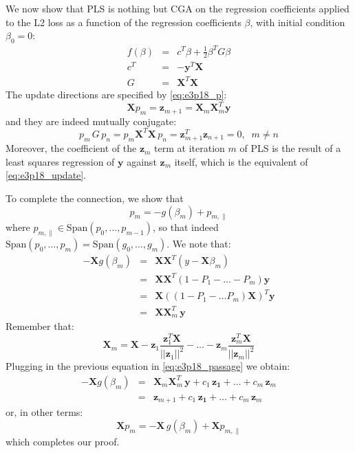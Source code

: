 We now show that PLS is nothing but CGA on the regression coefficients
applied to the L2 loss as a function of the regression coefficients
$\beta$, with initial condition $\beta_0 = 0$:
\begin{eqnarray*}
    f(\beta) & = & c^T \beta + \frac{1}{2} \beta^T G \beta \\
    c^T & = & - \mathbf{y}^T \mathbf{X} \\
    G & = & \mathbf{X}^T \mathbf{X}
\end{eqnarray*}
The update directions are specified by \eqref{eq:e3p18_p}:
\begin{equation*}
\mathbf{X} p_m  =  \mathbf{z}_{m + 1} = \mathbf{X}_m \mathbf{X}_m^T \mathbf{y}
\end{equation*}
and they are indeed mutually conjugate:
\begin{equation}
p_m \, G \, p_n = p_m \mathbf{X}^T \mathbf{X} \, p_n = 
    \mathbf{z}_{m + 1} ^T \mathbf{z}_{n + 1} = 0, \;\; m \neq n
\end{equation}
Moreover, the coefficient of the $\mathbf{z}_m$ term at iteration $m$ of PLS
is the result of a least squares regression of $\mathbf{y}$ against
$\mathbf{z}_m$ itself, which is the equivalent of \eqref{eq:e3p18_update}.

To complete the connection, we show that 
$$p_m = -g(\beta_m) + p_{m, \parallel}$$
where $p_{m, \parallel} \in \textrm{Span} \left(p_0, \ldots, p_{m - 1}\right)$,
so that indeed $\textrm{Span} \left(p_0, \ldots, p_m\right) = \textrm{Span} \left(g_0, \ldots, g_m\right)$. We note that:
\begin{eqnarray}
    - \mathbf{X} g(\beta_m) & = & \mathbf{X} \mathbf{X}^T \left(y - \mathbf{X} \beta_m\right) \\
    & = &  \mathbf{X} \mathbf{X}^T \left(1 - P_1 - \ldots - P_m\right) \mathbf{y} \\
    & = & \mathbf{X} \left((1 - P_1- \ldots P_m) \mathbf{X}\right)^T \mathbf{y} \\
    \label{eq:e3p18_passage}
    & = & \mathbf{X} \mathbf{X}_m^T\, \mathbf{y}
\end{eqnarray}
Remember that:
\begin{equation}
\mathbf{X}_m = \mathbf{X} 
    - \mathbf{z}_1 \frac{\mathbf{z}_1^T \mathbf{X}}{||\mathbf{z}_1||^2} - \ldots
    - \mathbf{z}_m \frac{\mathbf{z}_m^T \mathbf{X}}{||\mathbf{z}_m||^2}
\end{equation}
Plugging in the previous equation in \eqref{eq:e3p18_passage} we obtain:
\begin{eqnarray*}
    - \mathbf{X} g(\beta_m) & = & \mathbf{X}_m \mathbf{X}_m^T\, \mathbf{y} + 
        c_1\, \mathbf{z_1} + \ldots + c_m\, \mathbf{z}_m \\
        & = & \mathbf{z}_{m + 1} + c_1\, \mathbf{z_1} + \ldots + c_m\, \mathbf{z}_m
\end{eqnarray*}
or, in other terms:
\begin{equation*}
\mathbf{X} p_m = - \mathbf{X}\, g(\beta_m) + \mathbf{X} p_{m, \parallel}
\end{equation*}
which completes our proof.
